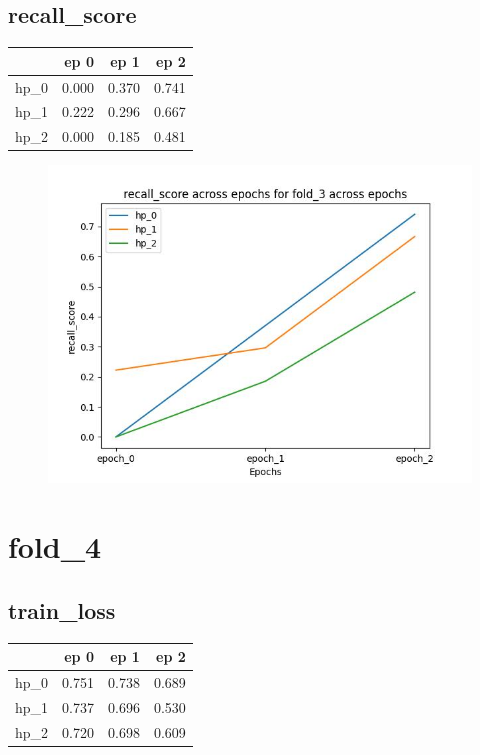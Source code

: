 \documentclass{article}
\begin{document}
\subsection{recall\_score}
\begin{tabular}{lrrr}
\toprule
{} &   ep 0 &   ep 1 &   ep 2 \\
\midrule
hp\_0 &  0.000 &  0.370 &  0.741 \\
hp\_1 &  0.222 &  0.296 &  0.667 \\
hp\_2 &  0.000 &  0.185 &  0.481 \\
\bottomrule
\end{tabular}

\begin{figure}[H]
\includegraphics[scale = 0.75]{fold_3/recall_score}
\end{figure}
\section{fold\_4}
\subsection{train\_loss}
\begin{tabular}{lrrr}
\toprule
{} &   ep 0 &   ep 1 &   ep 2 \\
\midrule
hp\_0 &  0.751 &  0.738 &  0.689 \\
hp\_1 &  0.737 &  0.696 &  0.530 \\
hp\_2 &  0.720 &  0.698 &  0.609 \\
\bottomrule
\end{tabular}
\end{document}
